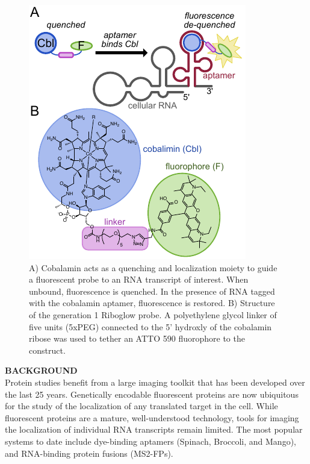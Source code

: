 \begin{figure}
\begin{centering}
\includegraphics[width=\textwidth]{figures/fig1v2.pdf}

\end{centering}
\footnotesize
\caption{\label{figure:riboglow}
A) Cobalamin acts as a quenching and localization moiety to guide a fluorescent probe to an RNA transcript of interest. When unbound, fluorescence is quenched. In the presence of RNA tagged with the cobalamin aptamer, fluorescence is restored. B) Structure of the generation 1 Riboglow probe. A polyethylene glycol linker of five units (5xPEG) connected to the 5' hydroxly of the cobalamin ribose was used to tether an ATTO 590 fluorophore to the construct.
}
\end{figure}

\textbf{BACKGROUND}\\
Protein studies benefit from a large imaging toolkit that has been developed over the last 25 years. Genetically encodable fluorescent proteins are now ubiquitous for the study of the localization of any translated target in the cell. While fluorescent proteins are a mature, well-understood technology, tools for imaging the localization of individual RNA transcripts remain limited. The most popular systems to date include dye-binding aptamers (Spinach\cite{PaigeRNAMimicsGreen2011}, Broccoli\cite{FilonovBroccoliRapidSelection2014}, and Mango\cite{AutourFluorogenicRNAMango2018,DolgosheinaRNAMangoAptamerFluorophore2014}), and RNA-binding protein fusions (MS2-FPs).\cite{FuscoSinglemRNAMolecules2003}

